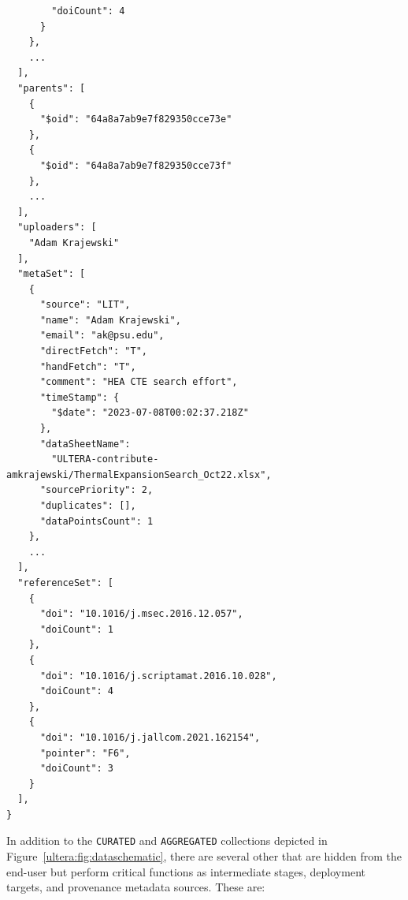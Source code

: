 \begin{verbatim}
        "doiCount": 4
      }
    },
    ...
  ],
  "parents": [
    {
      "$oid": "64a8a7ab9e7f829350cce73e"
    },
    {
      "$oid": "64a8a7ab9e7f829350cce73f"
    },
    ...
  ],
  "uploaders": [
    "Adam Krajewski"
  ],
  "metaSet": [
    {
      "source": "LIT",
      "name": "Adam Krajewski",
      "email": "ak@psu.edu",
      "directFetch": "T",
      "handFetch": "T",
      "comment": "HEA CTE search effort",
      "timeStamp": {
        "$date": "2023-07-08T00:02:37.218Z"
      },
      "dataSheetName": 
        "ULTERA-contribute-amkrajewski/ThermalExpansionSearch_Oct22.xlsx",
      "sourcePriority": 2,
      "duplicates": [],
      "dataPointsCount": 1
    },
    ...
  ],
  "referenceSet": [
    {
      "doi": "10.1016/j.msec.2016.12.057",
      "doiCount": 1
    },
    {
      "doi": "10.1016/j.scriptamat.2016.10.028",
      "doiCount": 4
    },
    {
      "doi": "10.1016/j.jallcom.2021.162154",
      "pointer": "F6",
      "doiCount": 3
    }
  ],
}
\end{verbatim}


In addition to the \texttt{CURATED} and \texttt{AGGREGATED} collections depicted in Figure~\ref{ultera:fig:dataschematic}, there are several other that are hidden from the end-user but perform critical functions as intermediate stages, deployment targets, and provenance metadata sources. These are:

